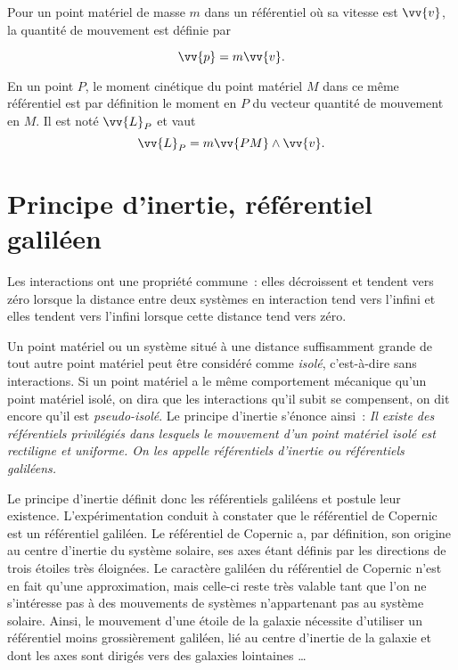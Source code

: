 \begin{defdef}
 Pour un point matériel de masse $m$ dans un référentiel où sa vitesse est $\vv{v}$, la quantité de mouvement est définie par

\begin{equation}
  \vv{p}=m\vv{v}.
\end{equation} 
\end{defdef}
%
\begin{defdef}
  En un point $P$, le moment cinétique du point matériel $M$ dans ce même référentiel est par définition le moment en $P$ du vecteur quantité de mouvement en $M$. Il est noté $\vv{L}_P$ et vaut
\begin{equation}
  \vv{L}_P=m\vv{PM} \wedge \vv{v}.
\end{equation}

\end{defdef}

\section{Principe d'inertie, référentiel galiléen}
\label{chap2-sec:principedinertie}

Les interactions ont une propriété commune~: elles décroissent et tendent vers zéro lorsque la distance entre deux systèmes en interaction tend vers l'infini et elles tendent vers l'infini lorsque cette distance tend vers zéro.

Un point matériel ou un système situé à une distance suffisamment grande de tout autre point matériel peut être considéré comme \emph{isolé}, c'est-à-dire sans interactions. Si un point matériel a le même comportement mécanique qu'un point matériel isolé, on dira que les interactions qu'il subit se compensent, on dit encore qu'il est \emph{pseudo-isolé}. Le principe d'inertie s'énonce ainsi~: \emph{Il existe des référentiels privilégiés dans lesquels le mouvement d'un point matériel isolé est rectiligne et uniforme. On les appelle référentiels d'inertie ou référentiels galiléens.}

Le principe d'inertie définit donc les référentiels galiléens et postule leur existence. L'expérimentation conduit à constater que le référentiel de Copernic est un référentiel galiléen. Le référentiel de Copernic a, par définition, son origine au centre d’inertie du système solaire, ses axes étant définis par les directions de trois étoiles très éloignées. Le caractère galiléen du référentiel de Copernic n'est en fait qu'une approximation, mais celle-ci reste très valable tant que l'on ne s'intéresse pas à des mouvements de systèmes n'appartenant pas au système solaire. Ainsi, le mouvement d'une étoile de la galaxie nécessite d'utiliser un référentiel moins grossièrement galiléen, lié au centre d'inertie de la galaxie et dont les axes sont dirigés vers des galaxies lointaines \ldots

